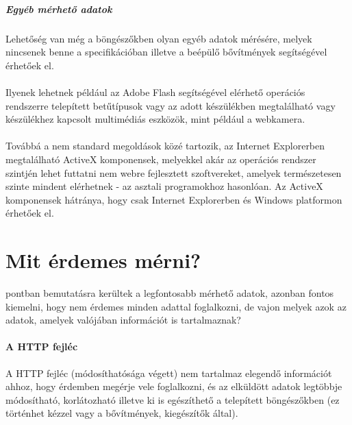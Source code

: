 \subparagraph{Egyéb mérhető adatok} %
\label{subp:egyéb_mérhető_adatok}
Lehetőség van még a böngészőkben olyan egyéb adatok mérésére, melyek nincsenek benne a specifikációban illetve a beépülő bővítmények segítségével érhetőek el.\hfill\\\\
Ilyenek lehetnek például az Adobe Flash segítségével elérhető operációs rendszerre telepített betűtípusok vagy az adott készülékben megtalálható vagy készülékhez kapcsolt multimédiás eszközök, mint például a webkamera.\hfill\\\\
Továbbá a nem standard megoldások közé tartozik, az Internet Explorerben megtalálható ActiveX komponensek, melyekkel akár az operációs rendszer szintjén lehet futtatni nem webre fejlesztett szoftvereket, amelyek természetesen szinte mindent elérhetnek - az asztali programokhoz hasonlóan. Az ActiveX komponensek hátránya, hogy csak Internet Explorerben és Windows platformon érhetőek el.



\section{Mit érdemes mérni?} %
\label{sec:mit_erdemes_merni_}

 pontban bemutatásra kerültek a legfontosabb mérhető adatok, azonban fontos kiemelni, hogy nem érdemes minden adattal foglalkozni, de vajon melyek azok az adatok, amelyek valójában információt is tartalmaznak?\hfill\\

\paragraph{A HTTP fejléc} %
\label{par:a_http_fejléc}
A HTTP fejléc (módosíthatósága végett) nem tartalmaz elegendő információt ahhoz, hogy érdemben megérje vele foglalkozni, és az elküldött adatok legtöbbje módosítható, korlátozható illetve ki is egészíthető a telepített böngészőkben (ez történhet kézzel vagy a bővítmények, kiegészítők által).

